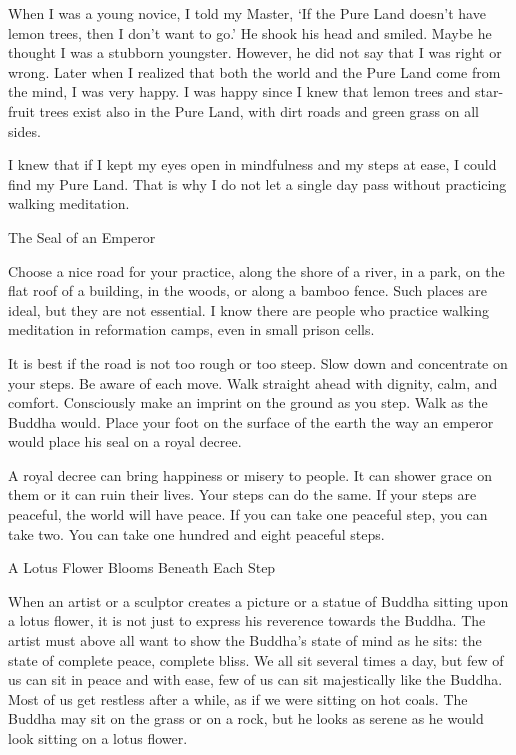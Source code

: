 When I was a young novice, I told my Master, ‘If the Pure Land doesn’t have lemon trees, then I don’t want to go.’  He shook his head and smiled.  Maybe he thought I was a stubborn youngster.  However, he did not say that I was right or wrong.  Later when I realized that both the world and the Pure Land come from the mind, I was very happy.  I was happy since I knew that lemon trees and star-fruit trees exist also in the Pure Land, with dirt roads and green grass on all sides.

I knew that if I kept my eyes open in mindfulness and my steps at ease, I could find my Pure Land.  That is why I do not let a single day pass without practicing walking meditation.

 

The Seal of an Emperor

Choose a nice road for your practice, along the shore of a river, in a park, on the flat roof of a building, in the woods, or along a bamboo fence.  Such places are ideal, but they are not essential.  I know there are people who practice walking meditation in reformation camps, even in small prison cells.

It is best if the road is not too rough or too steep.  Slow down and concentrate on your steps.  Be aware of each move.  Walk straight ahead with dignity, calm, and comfort.  Consciously make an imprint on the ground as you step.  Walk as the Buddha would.  Place your foot on the surface of the earth the way an emperor would place his seal on a royal decree.

A royal decree can bring happiness or misery to people.  It can shower grace on them or it can ruin their lives.  Your steps can do the same.  If your steps are peaceful, the world will have peace.  If you can take one peaceful step, you can take two.  You can take one hundred and eight peaceful steps.

 

A Lotus Flower Blooms Beneath Each Step

When an artist or a sculptor creates a picture or a statue of Buddha sitting upon a lotus flower, it is not just to express his reverence towards the Buddha.  The artist must above all want to show the Buddha’s state of mind as he sits: the state of complete peace, complete bliss.  We all sit several times a day, but few of us can sit in peace and with ease, few of us can sit majestically like the Buddha.  Most of us get restless after a while, as if we were sitting on hot coals.  The Buddha may sit on the grass or on a rock, but he looks as serene as he would look sitting on a lotus flower.


